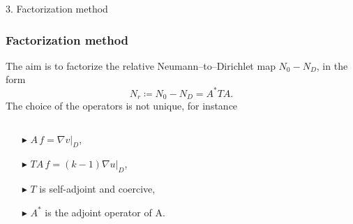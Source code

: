 \documentclass[10pt,xcolor={dvipsnames}]{beamer}
\theoremstyle{plain}
\theoremstyle{plain}
\begin{document}
\begin{frame}[noframenumbering]
 \begin{center}
 \Large
 {\color{purple} 3. Factorization method}
 \end{center}
\end{frame}
\begin{frame}
 \frametitle{Factorization method}
{ \small
 The aim is to factorize the relative Neumann--to--Dirichlet map ${N_0} - {N_D}$, in the form}
\begin{equation}
 {N_r}\coloneqq{N_0} - {N_D} = A^*TA.
\end{equation}
{\small
The choice of the operators is not unique, for instance
}
\begin{columns}[T]
\begin{column}{0.44\textwidth}
\vspace{0.8cm}
\begin{itemize}
\small
 \item[$\blacktriangleright$]
 $A\,f = \nabla v|_D$,
 \item[$\blacktriangleright$]
 $TA\,f = 
 (k-1) \nabla u|_D$,
 \item[$\blacktriangleright$] $T$ is self-adjoint and coercive,
 \item[$\blacktriangleright$]
 $A^*$ is the adjoint operator of A. 
\end{itemize}\end{column}
\begin{column}{0.6\textwidth}
\begin{center}
\end{center}
\end{column}
\end{columns}

\end{frame}
\end{document}
